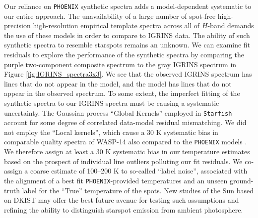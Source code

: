 \documentclass[trackchanges]{aastex631}
\begin{document}
Our reliance on \texttt{PHOENIX} synthetic spectra adds a model-dependent systematic to our entire approach.  The unavailability of a large number of spot-free high-precision high-resolution empirical template spectra across all of $H$-band demands the use of these models in order to compare to IGRINS data.  The ability of such synthetic spectra to resemble starspots remains an unknown.  We can examine fit residuals to explore the performance of the synthetic spectra by comparing the purple two-component composite spectrum to the gray IGRINS spectrum in Figure \ref{fig:IGRINS_spectra3x3}. We see that the observed IGRINS spectrum has lines that do not appear in the model, and the model has lines that do not appear in the observed spectrum. To some extent, the imperfect fitting of the synthetic spectra to our IGRINS spectra must be causing a systematic uncertainty.  The Gaussian process ``Global Kernels'' employed in \texttt{Starfish} account for some degree of correlated data-model residual mismatching.  We did not employ the ``Local kernels'', which cause a 30 K systematic bias in comparable quality spectra of WASP-14 also compared to the \texttt{PHOENIX} models \citet{czekala15}.  We therefore assign at least a 30 K systematic bias in our temperature estimates based on the prospect of individual line outliers polluting our fit residuals.  We co-assign a coarse estimate of 100--200 K to so-called ``label noise'', associated with the alignment of a best fit \texttt{PHOENIX}-provided temperatures and an unseen ground-truth label for the ``True'' temperature of the spots. New studies of the Sun based on DKIST may offer the best future avenue for testing such assumptions and refining the ability to distinguish starspot emission from ambient photosphere.



\end{document}
